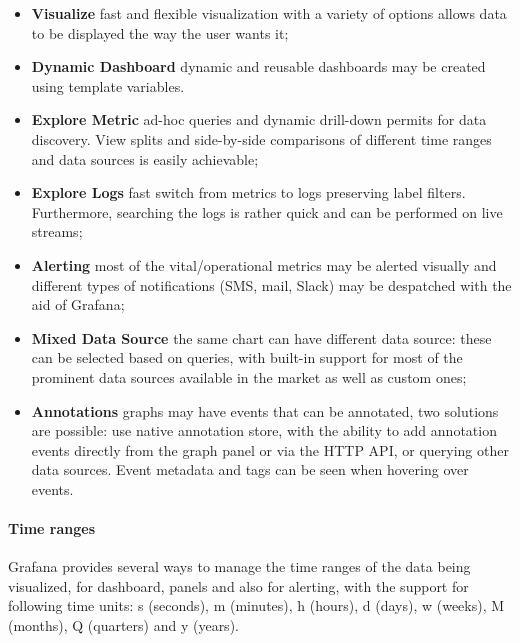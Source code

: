\begin{itemize}
    \item \textbf{Visualize} fast and flexible visualization with a variety of options allows data to be displayed the way the user wants it;
    \item \textbf{Dynamic Dashboard} dynamic and reusable dashboards may be created using template variables.
    \item \textbf{Explore Metric} ad-hoc queries and dynamic drill-down permits for data discovery.
          View splits and side-by-side comparisons of different time ranges and data sources is easily achievable;
    \item \textbf{Explore Logs} fast switch from metrics to logs preserving label filters. Furthermore, searching the logs is rather quick and can be performed on live streams;
    \item \textbf{Alerting} most of the vital/operational metrics may be alerted visually and different types of notifications (SMS, mail, Slack) may be despatched with the aid of Grafana;
    \item \textbf{Mixed Data Source} the same chart can have different data source: these can be selected based on queries, with built-in support for most of the prominent data sources available in the market as well as custom ones;
    \item \textbf{Annotations} graphs may have events that can be annotated, two solutions are possible:
          use native annotation store, with the ability to add annotation events directly from the graph panel or via the HTTP API, or querying other data sources.
          Event metadata and tags can be seen when hovering over events.
\end{itemize}
\paragraph{Time ranges}
Grafana provides several ways to manage the time ranges of the data being visualized, for dashboard, panels and also for alerting,
with the support for following time units: s (seconds), m (minutes), h (hours), d (days), w (weeks), M (months), Q (quarters) and y (years).


